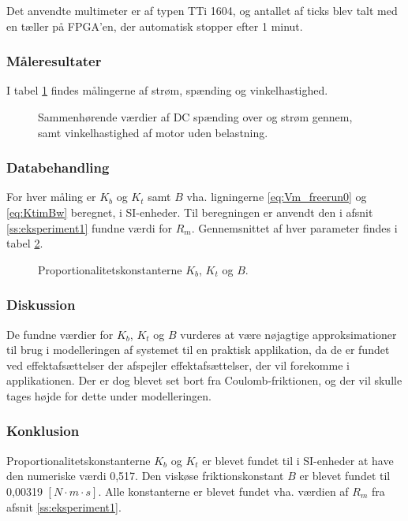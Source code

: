 Det anvendte multimeter er af typen TTi 1604,
og antallet af ticks blev talt med en tæller på FPGA'en, der automatisk stopper efter 1 minut.
\subsubsection{Måleresultater}
I tabel \ref{tb:steadystatenoload} findes målingerne af strøm, spænding og vinkelhastighed.
\begin{figure}[th!]
	\centering
	
	\captionsetup{type=table}
	\caption[Steady-state spænding, strøm og vinkelhastighed uden belastning]
			{Sammenhørende værdier af DC spænding over og strøm gennem, samt vinkelhastighed af motor uden belastning.}
	\label{tb:steadystatenoload}
\end{figure}
\subsubsection{Databehandling}
For hver måling er \(K_b\) og \(K_t\) samt \(B\) vha. ligningerne \ref{eq:Vm_freerun0} og \ref{eq:KtimBw} beregnet,
i SI-enheder. Til beregningen er anvendt den i afsnit \ref{ss:eksperiment1} fundne værdi for \(R_m\).
Gennemsnittet af hver parameter findes i tabel \ref{tb:kbktb}.
\begin{figure}[th!]
	\centering
	
	\captionsetup{type=table}
	\caption[Proportionalitetskonstanterne \(K_b\), \(K_t\) og \(B\)]
			{Proportionalitetskonstanterne \(K_b\), \(K_t\) og \(B\).}
	\label{tb:kbktb}
\end{figure}

\subsubsection{Diskussion}
De fundne værdier for \(K_b\), \(K_t\) og \(B\) vurderes at være nøjagtige approksimationer
til brug i modelleringen af systemet til en praktisk applikation, da de er fundet ved effektafsættelser
der afspejler effektafsættelser, der vil forekomme i applikationen.
Der er dog blevet set bort fra Coulomb-friktionen, og der vil skulle tages højde for dette under modelleringen.
\subsubsection{Konklusion}
Proportionalitetskonstanterne \(K_b\) og \(K_t\) er blevet fundet til i SI-enheder at have den numeriske værdi 0,517.
Den viskøse friktionskonstant \(B\) er blevet fundet til 0,00319 \([N \cdot m \cdot s]\).
Alle konstanterne er blevet fundet vha. værdien af \(R_m\) fra afsnit \ref{ss:eksperiment1}.
